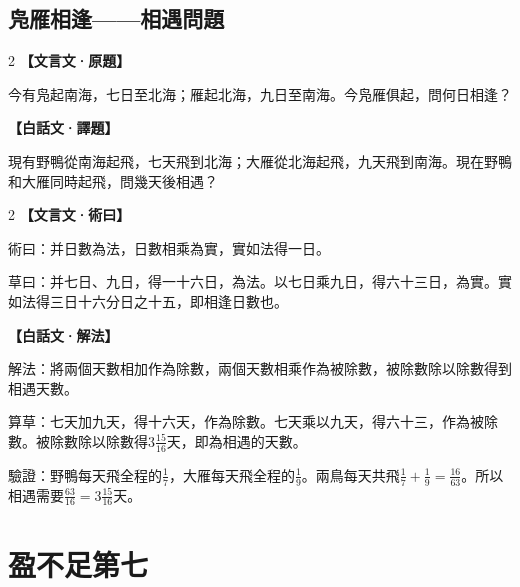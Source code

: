 \documentclass[11pt,a4paper]{article}
\newcommand{\zhc}{}[1]{{\CJKfamily{\CJKrmdefault}#1}}  %
\newcommand{\zhm}[1]{{\CJKfamily{\CJKrmdefault}#1}}  %
\newenvironment{prob bilingual}[1][]{%
  \begin{paracol}{2}%
  \setlength{\columnseprule}{0.4pt}%
}{%
  \end{paracol}%
  \medskip%
}
\begin{document}
\subsection{\zhc{凫雁相逢——相遇問題}}

\begin{paracol}{2}
\switchcolumn[0]
\noindent\textbf{\textcolor{notecolor}{\zhc{【文言文·原題】}}}\par\smallskip
\zhc{
今有凫起南海，七日至北海；雁起北海，九日至南海。今凫雁俱起，問何日相逢？
}

\switchcolumn[1]
\noindent\textbf{\textcolor{notecolor}{\zhm{【白話文·譯題】}}}\par\smallskip
\zhm{
現有野鴨從南海起飛，七天飛到北海；大雁從北海起飛，九天飛到南海。現在野鴨和大雁同時起飛，問幾天後相遇？
}
\end{paracol}

\medskip

\begin{paracol}{2}
\switchcolumn[0]
\noindent\textbf{\textcolor{notecolor}{\zhc{【文言文·術曰】}}}\par\smallskip
\zhc{
術曰：并日數為法，日數相乘為實，實如法得一日。

草曰：并七日、九日，得一十六日，為法。以七日乘九日，得六十三日，為實。實如法得三日十六分日之十五，即相逢日數也。
}

\switchcolumn[1]
\noindent\textbf{\textcolor{notecolor}{\zhm{【白話文·解法】}}}\par\smallskip
\zhm{
解法：將兩個天數相加作為除數，兩個天數相乘作為被除數，被除數除以除數得到相遇天數。

算草：七天加九天，得十六天，作為除數。七天乘以九天，得六十三，作為被除數。被除數除以除數得$3\frac{15}{16}$天，即為相遇的天數。

驗證：野鴨每天飛全程的$\frac{1}{7}$，大雁每天飛全程的$\frac{1}{9}$。兩鳥每天共飛$\frac{1}{7}+\frac{1}{9}=\frac{16}{63}$。所以相遇需要$\frac{63}{16}=3\frac{15}{16}$天。
}
\end{paracol}

\newpage

\section{\zhc{盈不足第七}}
\label{sec:yingbuzu}
\end{document}
